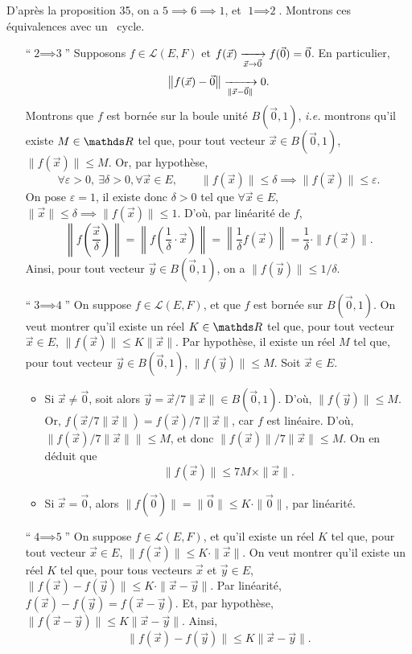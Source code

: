 \begin{prv}
	D'après la proposition 35, on a $\text{5}\implies \text{6} \implies \text{1}$, et $\text{1} \implies \text{2}$.
	Montrons ces équivalences avec un \guillemotleft~cycle.~\guillemotright\@ 
	\begin{itemize}
		\item[``$\text{2}\implies \text{3}$''] Supposons $f \in \mathcal{L}(E, F)$\/ et $f(\vec{x}) \xrightarrow[\vec{x} \to \vec{0}]{} f(\vec{0}) = \vec{0}$.
			En particulier, \[
				\big\|f(\vec{x}) - \vec{0} \big\| \xrightarrow[\|\vec{x} - \vec{0}\|]{} 0
			.\]
			Montrons que $f$\/ est bornée sur la boule unité $B(\vec{0}, 1)$, \textit{i.e.} montrons qu'il existe $M \in \R$\/ tel que, pour tout vecteur $\vec{x} \in B(\vec{0}, 1)$, $\|f(\vec{x})\| \le M$.
			Or, par hypothèse, \[
				\forall \varepsilon > 0,\: \exists \delta > 0,\forall \vec{x} \in E, \quad\quad \|f(\vec{x})\| \le \delta \implies \|f(\vec{x})\| \le \varepsilon
			.\] On pose $\varepsilon = 1$, il existe donc $\delta > 0$\/ tel que $\forall \vec{x} \in E$, $\|\vec{x}\| \le \delta \implies \|f(\vec{x})\| \le 1$.
			D'où, par linéarité de $f$, \[
				\left\|f\left( \frac{\vec{x}}{\delta} \right)\right\| = \left\|f\left(\frac{1}{\delta} \cdot \vec{x}\right)\right\| = \left\|\frac{1}{\delta} f(\vec{x})\right\| = \frac{1}{\delta} \cdot \|f(\vec{x})\|
			.\] Ainsi, pour tout vecteur $\vec{y} \in B(\vec{0}, 1)$, on a $\|f(\vec{y})\| \le 1 / \delta$.
		\item[``$\text{3}\implies \text{4}$'']
			On suppose $f \in \mathcal{L}(E, F)$, et que $f$\/ est bornée sur $B(\vec{0}, 1)$.
			On veut montrer qu'il existe un réel $K \in \R$\/ tel que, pour tout vecteur $\vec{x} \in E$, $\|f(\vec{x})\| \le K \|\vec{x}\|$.
			Par hypothèse, il existe un réel $M$\/ tel que, pour tout vecteur $\vec{y} \in B(\vec{0},1)$, $\|f(\vec{y})\| \le M$.
			Soit $\vec{x} \in E$.
			\begin{itemize}
				\item Si $\vec{x} \neq  \vec{0}$, soit alors $\vec{y} = \vec{x} / 7\|\vec{x}\| \in B(\vec{0},1)$. D'où, $\|f(\vec{y})\| \le M$.
					Or, $f(\vec{x} / 7\|\vec{x}\|) = f(\vec{x}) / 7\|\vec{x}\|$, car $f$\/ est linéaire.
					D'où, $\|f(\vec{x}) / 7\|\vec{x}\|\| \le M$, et donc $\|f(\vec{x})\| / 7\|\vec{x}\| \le M$. On en déduit que \[
						\|f(\vec{x})\| \le 7M \times \|\vec{x}\|
					.\]
				\item Si $\vec{x} = \vec{0}$, alors $\|f(\vec{0})\| = \|\vec{0}\| \le K \cdot \|\vec{0}\|$, par linéarité.
			\end{itemize}
		\item[``$\text{4}\implies \text{5}$'']
			On suppose $f \in \mathcal{L}(E, F)$, et qu'il existe un réel $K$\/ tel que, pour tout vecteur $\vec{x} \in E$, $\|f(\vec{x})\| \le K \cdot \|\vec{x}\|$.
			On veut montrer qu'il existe un réel $K$\/ tel que, pour tous vecteurs $\vec{x}$\/ et $\vec{y} \in E$, $\|f(\vec{x}) - f(\vec{y})\| \le K \cdot \|\vec{x} - \vec{y}\|$.
			Par linéarité, $f(\vec{x}) - f(\vec{y}) = f(\vec{x} - \vec{y})$. Et, par hypothèse, $\|f(\vec{x} - \vec{y})\| \le K \|\vec{x} - \vec{y}\|$. Ainsi, \[
				\|f(\vec{x}) - f(\vec{y})\| \le K \|\vec{x} - \vec{y}\|
			.\]
	\end{itemize}
\end{prv}

